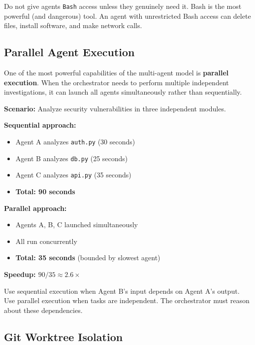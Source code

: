 \documentclass[11pt,letterpaper]{article}
\begin{document}
\begin{warningbox}
Do not give agents \texttt{Bash} access unless they genuinely need it. Bash is the most powerful (and dangerous) tool. An agent with unrestricted Bash access can delete files, install software, and make network calls.
\end{warningbox}

\subsection{Parallel Agent Execution}

One of the most powerful capabilities of the multi-agent model is \textbf{parallel execution}. When the orchestrator needs to perform multiple independent investigations, it can launch all agents simultaneously rather than sequentially.

\begin{examplebox}[title=Parallel vs Sequential Agent Execution]
\textbf{Scenario:} Analyze security vulnerabilities in three independent modules.

\textbf{Sequential approach:}
\begin{itemize}
    \item Agent A analyzes \texttt{auth.py} (30 seconds)
    \item Agent B analyzes \texttt{db.py} (25 seconds)
    \item Agent C analyzes \texttt{api.py} (35 seconds)
    \item \textbf{Total: 90 seconds}
\end{itemize}

\textbf{Parallel approach:}
\begin{itemize}
    \item Agents A, B, C launched simultaneously
    \item All run concurrently
    \item \textbf{Total: 35 seconds} (bounded by slowest agent)
\end{itemize}

\textbf{Speedup: $90/35 \approx 2.6\times$}
\end{examplebox}

\begin{notebox}
Use sequential execution when Agent B's input depends on Agent A's output. Use parallel execution when tasks are independent. The orchestrator must reason about these dependencies.
\end{notebox}

\subsection{Git Worktree Isolation}
\end{document}
